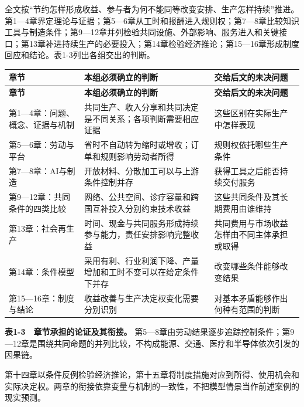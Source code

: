 \documentclass[UTF8,fontset=windows,12pt,a4paper,oneside,openany]{ctexbook}
\begin{document}
全文按“节约怎样形成收益、参与者为何不能同等改变安排、生产怎样持续”推进。第1—4章界定理论与证据；第5—6章从工时和报酬进入规则权；第7—8章比较知识工具与制造条件；第9—12章并列检验共同设施、外部影响、服务进入和关键接口；第13章补进持续生产的必要投入；第14章检验经济推论；第15—16章形成制度回应和结论。表1-3列出各组交出的判断。

\begingroup\footnotesize\setlength{\tabcolsep}{4pt}\renewcommand{\arraystretch}{1.25}
\begin{longtable}{>{\raggedright\arraybackslash}p{}>{\raggedright\arraybackslash}p{}>{\raggedright\arraybackslash}p{}}
\toprule
\textbf{章节} & \textbf{本组必须确立的判断} & \textbf{交给后文的未决问题} \\
\midrule\endfirsthead
\toprule
\textbf{章节} & \textbf{本组必须确立的判断} & \textbf{交给后文的未决问题} \\
\midrule\endhead
\bottomrule\endfoot
第1—4章：问题、概念、证据与机制 & 共同生产、收入分享和共同决定是不同关系；各项判断需要相应证据 & 这些区别在实际生产中怎样表现 \\
第5—6章：劳动与平台 & 省时不自动转为缩时或增收；订单和规则影响劳动者所得 & 规则权依托哪些生产条件 \\
第7—8章：AI与制造 & 开放材料、分散加工可以与上游条件控制并存 & 获得工具之后能否持续交付服务 \\
第9—12章：共同条件的四类比较 & 网络、公共空间、诊疗容量和跨国互补投入分别约束技术收益 & 这些共同条件及其长期费用由谁维持 \\
第13章：社会再生产 & 时间、现金与共同服务形成持续参与能力，责任安排影响完整收益 & 共同费用与市场收益怎样由不同主体承担或取得 \\
第14章：条件模型 & 采用有利、行业利润下降、产量增加和工时不变可以在给定条件下并存 & 改变哪些条件能够改变结果 \\
第15—16章：制度与结论 & 收益改善与生产决定权变化需要分别识别 & 对基本矛盾能够作出何种有范围的判断 \\
\end{longtable}\endgroup


\textbf{表1-3　章节承担的论证及其衔接。} 第5—8章由劳动结果逐步追踪控制条件；第9—12章是围绕共同命题的并列比较，不构成能源、交通、医疗和半导体依次引发的因果链。



第十四章以条件反例检验经济推论，第十五章将制度措施对应到所得、使用机会和实际决定权。两章的衔接依靠变量与机制的一致性，不把模型情景当作前述案例的现实预测。
\end{document}
